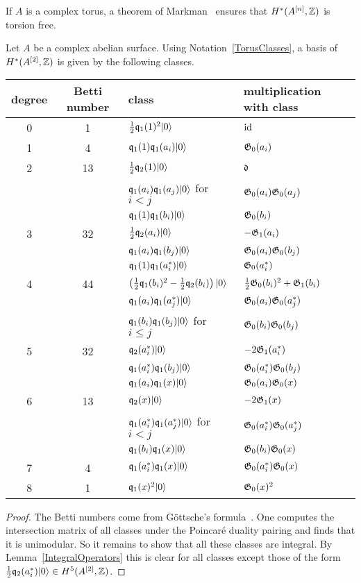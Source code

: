 \begin{remark}
If $A$ is a complex torus, a theorem of Markman~\cite{Markman} ensures that $H^*(A^{[n]},\mathbb{Z})$ is torsion free.
\end{remark} 

\begin{proposition} \label{A2Basis}
Let $A$ be a complex abelian surface. Using Notation~\ref{TorusClasses}, a basis of $H^*(A^{[2]},\mathbb{Z})$ is given by the following classes.
\begin{center}
\begin{tabular}{c|c|l|l}
 degree & Betti number & class & multiplication with class \\\hline
 0 & 1 & $\frac{1}{2}\mathfrak{q}_1(1)^2|0\rangle$ & $\operatorname{id}$ \\ \hline
 1 & 4 &  $\mathfrak{q}_1(1)\mathfrak{q}_1(a_i)|0\rangle$ & $\mathfrak{G}_0(a_i)$ \\ \hline
 2 & 13 & $\frac{1}{2}\mathfrak{q}_2(1)|0\rangle$ & $\mathfrak{d}$ \\ 
   &  & $\mathfrak{q}_1(a_i)\mathfrak{q}_1(a_j)|0\rangle$ for $i<j$ & $\mathfrak{G}_0(a_i)\mathfrak{G}_0(a_j)$ \\
   &  & $\mathfrak{q}_1(1)\mathfrak{q}_1(b_i)|0\rangle$ & $\mathfrak{G}_0(b_i)$ \\\hline
 3 & 32 & $\frac{1}{2}\mathfrak{q}_2(a_i)|0\rangle$  & $-\mathfrak{G}_1(a_i) $ \\
   &  & $\mathfrak{q}_1(a_i)\mathfrak{q}_1(b_j)|0\rangle$ & $\mathfrak{G}_0(a_i)\mathfrak{G}_0(b_j)$ \\ 
   &  & $\mathfrak{q}_1(1)\mathfrak{q}_1(a^*_i)|0\rangle$ & $\mathfrak{G}_0(a^*_i)$ \\\hline
 4 & 44 & $\left(\frac{1}{2}\mathfrak{q}_1(b_i)^2-\frac{1}{2}\mathfrak{q}_2(b_i)\right)|0\rangle$ & $\frac{1}{2} \mathfrak{G}_0(b_i)^2 + \mathfrak{G}_1(b_i) $ \\
   &  & $\mathfrak{q}_1(a_i)\mathfrak{q}_1(a^*_j)|0\rangle$ & $\mathfrak{G}_0(a_i)\mathfrak{G}_0(a^*_j)$ \\
   &  & $ \mathfrak{q}_1(b_i)\mathfrak{q}_1(b_j)|0\rangle$ for $i\leq j$ &  $\mathfrak{G}_0(b_i)\mathfrak{G}_0(b_j)$ \\\hline
 5 & 32 & $\mathfrak{q}_2(a^*_i)|0\rangle$ & $-2\mathfrak{G}_1(a^*_i)$ \\
   &  & $\mathfrak{q}_1(a^*_i)\mathfrak{q}_1(b_j)|0\rangle$ & $ \mathfrak{G}_0(a^*_i)\mathfrak{G}_0(b_j)$ \\
   &  & $\mathfrak{q}_1(a_i)\mathfrak{q}_1(x)|0\rangle$ & $\mathfrak{G}_0(a_i)\mathfrak{G}_0(x)$ \\\hline
 6 & 13 & $\mathfrak{q}_2(x)|0\rangle$ & $-2\mathfrak{G}_1(x)$ \\
   &  & $\mathfrak{q}_1(a^*_i)\mathfrak{q}_1(a^*_j)|0\rangle$ for $i<j$ & $\mathfrak{G}_0(a^*_i)\mathfrak{G}_0(a^*_j)$ \\
   &  & $\mathfrak{q}_1(b_i)\mathfrak{q}_1(x)|0\rangle$ & $ \mathfrak{G}_0(b_i)\mathfrak{G}_0(x)$ \\\hline
 7 & 4 & $\mathfrak{q}_1(a^*_i)\mathfrak{q}_1(x)|0\rangle$ & $\mathfrak{G}_0(a^*_i)\mathfrak{G}_0(x) $ \\\hline
 8 & 1 & $\mathfrak{q}_1(x)^2|0\rangle$ & $\mathfrak{G}_0(x)^2$ 
\end{tabular}
\end{center}
\begin{proof}
The Betti numbers come from G\"ottsche's formula~\cite{Gottsche}.
One computes the intersection matrix of all classes under the Poincar\'e duality pairing and finds that it is unimodular. 
So it remains to show that all these classes are integral. By Lemma~\ref{IntegralOperators} this is clear for all classes except 
those of the form $\frac{1}{2}\mathfrak{q}_2(a^*_i)|0\rangle \in H^5(A^{[2]},\mathbb{Z})$.


\end{proof}
\end{proposition}

